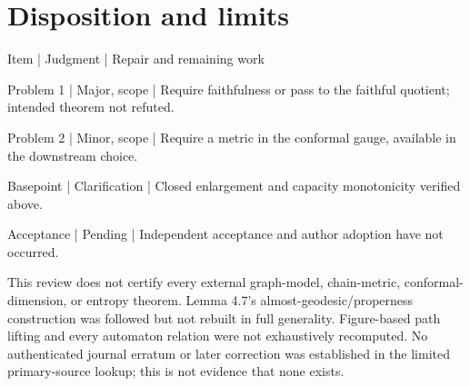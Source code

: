 \documentclass[10pt]{article}
\begin{document}
\section*{Disposition and limits}
Item | Judgment | Repair and remaining work\par
Problem 1 | Major, scope | Require faithfulness or pass to the faithful quotient; intended theorem not refuted.\par
Problem 2 | Minor, scope | Require a metric in the conformal gauge, available in the downstream choice.\par
Basepoint | Clarification | Closed enlargement and capacity monotonicity verified above.\par
Acceptance | Pending | Independent acceptance and author adoption have not occurred.\par
This review does not certify every external graph-model, chain-metric, conformal-dimension, or entropy theorem. Lemma 4.7’s almost-geodesic/properness construction was followed but not rebuilt in full generality. Figure-based path lifting and every automaton relation were not exhaustively recomputed. No authenticated journal erratum or later correction was established in the limited primary-source lookup; this is not evidence that none exists.\par
\end{document}
